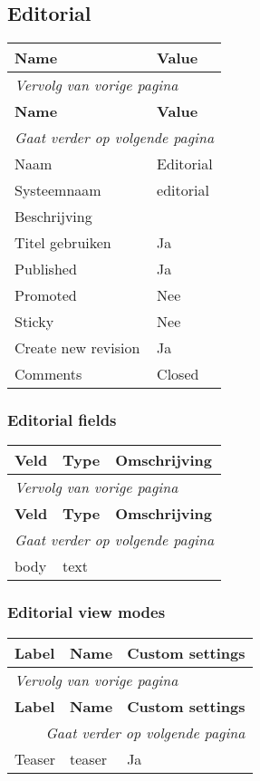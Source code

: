 \subsection{Editorial}
\label{sec:content-editorial}
  \begin{longtable}{| p{7.50cm}|p{7.50cm}|}
  \hline
  \rowcolor{tableheader}
  \textbf{Name} & \textbf{Value}  \tabularnewline
  \hline
\endfirsthead
\multicolumn{2}{l}{\textit{Vervolg van vorige pagina}} \\
\hline
\rowcolor{tableheader}
  \textbf{Name} & \textbf{Value}  \tabularnewline
  \hline
\hline
\endhead
\multicolumn{2}{r}{\textit{Gaat verder op volgende pagina}} \\
\endfoot
\hline
\endlastfoot
  Naam & Editorial  \tabularnewline
  \hline
  Systeemnaam & editorial  \tabularnewline
  \hline
  Beschrijving &   \tabularnewline
  \hline
  Titel gebruiken & Ja  \tabularnewline
  \hline
  Published & Ja  \tabularnewline
  \hline
  Promoted & Nee  \tabularnewline
  \hline
  Sticky & Nee  \tabularnewline
  \hline
  Create new revision & Ja  \tabularnewline
  \hline
  Comments & Closed  \tabularnewline
  \hline
  \end{longtable}

\subsubsection{Editorial fields}
  \begin{longtable}{| p{5.00cm}|p{5.00cm}|p{5.00cm}|}
  \hline
  \rowcolor{tableheader}
  \textbf{Veld} & \textbf{Type} & \textbf{Omschrijving}  \tabularnewline
  \hline
\endfirsthead
\multicolumn{3}{l}{\textit{Vervolg van vorige pagina}} \\
\hline
\rowcolor{tableheader}
  \textbf{Veld} & \textbf{Type} & \textbf{Omschrijving}  \tabularnewline
  \hline
\hline
\endhead
\multicolumn{3}{r}{\textit{Gaat verder op volgende pagina}} \\
\endfoot
\hline
\endlastfoot
  body & text &   \tabularnewline
  \hline
  \end{longtable}

\subsubsection{Editorial view modes}
  \begin{longtable}{| p{5.00cm}|p{5.00cm}|p{5.00cm}|}
  \hline
  \rowcolor{tableheader}
  \textbf{Label} & \textbf{Name} & \textbf{Custom settings}  \tabularnewline
  \hline
\endfirsthead
\multicolumn{3}{l}{\textit{Vervolg van vorige pagina}} \\
\hline
\rowcolor{tableheader}
  \textbf{Label} & \textbf{Name} & \textbf{Custom settings}  \tabularnewline
  \hline
\hline
\endhead
\multicolumn{3}{r}{\textit{Gaat verder op volgende pagina}} \\
\endfoot
\hline
\endlastfoot
  Teaser & teaser & Ja  \tabularnewline
  \hline
  \end{longtable}

